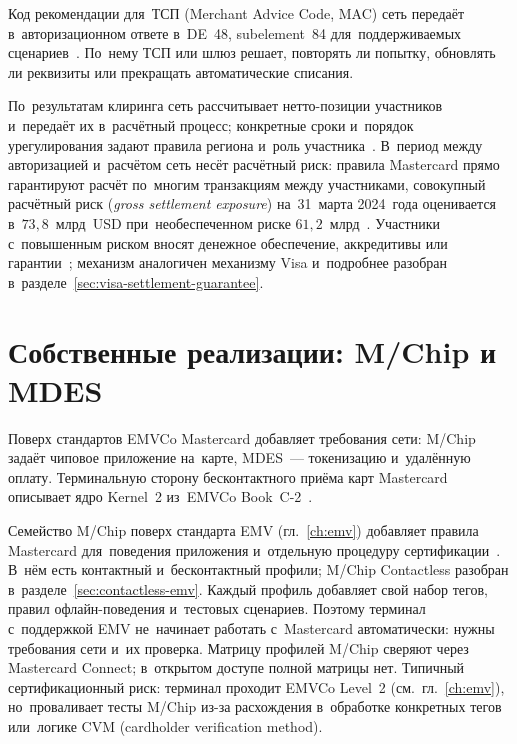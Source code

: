 Код рекомендации для~ТСП (Merchant Advice Code, MAC) сеть передаёт
в~авторизационном ответе в~DE~48, subelement~84 для~поддерживаемых
сценариев~\cite{mc-tpr}. По~нему ТСП или шлюз решает, повторять ли попытку,
обновлять ли реквизиты или прекращать автоматические списания.

По~результатам клиринга сеть рассчитывает нетто-позиции участников и~передаёт
их в~расчётный процесс; конкретные сроки и~порядок урегулирования задают
правила региона и~роль участника~\cite{mc-rules}. В~период между авторизацией
и~расчётом сеть несёт расчётный риск: правила Mastercard прямо гарантируют
расчёт по~многим транзакциям между участниками, совокупный расчётный риск
(\textit{gross settlement exposure}) на~31~марта 2024~года оценивается
в~$73{,}8$~млрд~USD при~необеспеченном риске
$61{,}2$~млрд~\cite{mc-10q-settlement-risk-q1-2024}. Участники с~повышенным
риском вносят денежное обеспечение, аккредитивы или
гарантии~\cite{mc-10q-settlement-risk-q1-2024}; механизм аналогичен
механизму Visa и~подробнее разобран в~разделе~\ref{sec:visa-settlement-guarantee}.

\section{Собственные реализации: M/Chip и MDES}\label{sec:mc-proprietary}

Поверх стандартов EMVCo Mastercard добавляет требования сети: M/Chip
задаёт чиповое приложение на~карте, MDES~--- токенизацию и~удалённую оплату.
Терминальную сторону бесконтактного приёма карт Mastercard описывает ядро
Kernel~2 из~EMVCo Book~C-2~\cite{emvco-contactless-book-c2}.

Семейство M/Chip поверх стандарта EMV (гл.~\ref{ch:emv}) добавляет правила
Mastercard для~поведения приложения и~отдельную процедуру
сертификации~\cite{usps-forum-payment-network-l3-2023}. В~нём есть контактный
и~бесконтактный профили; M/Chip Contactless разобран
в~разделе~\ref{sec:contactless-emv}. Каждый профиль добавляет свой набор тегов,
правил офлайн-поведения и~тестовых сценариев. Поэтому терминал с~поддержкой
EMV не~начинает работать с~Mastercard автоматически: нужны требования сети
и~их проверка. Матрицу профилей M/Chip сверяют через Mastercard Connect;
в~открытом доступе полной матрицы нет. Типичный сертификационный риск: терминал
проходит EMVCo Level~2 (см.~гл.~\ref{ch:emv}), но~проваливает тесты M/Chip
из-за расхождения в~обработке конкретных тегов или~логике CVM (cardholder
verification method).


